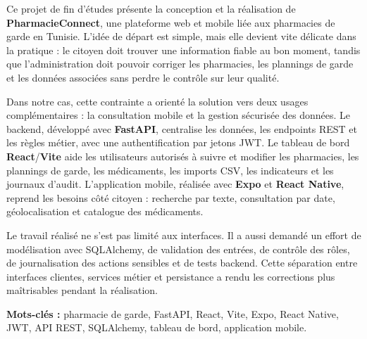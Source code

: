 Ce projet de fin d'études présente la conception et la réalisation de \textbf{PharmacieConnect}, une
plateforme web et mobile liée aux pharmacies de garde en Tunisie. L'idée de départ est simple, mais elle
devient vite délicate dans la pratique : le citoyen doit trouver une information fiable au bon moment, tandis
que l'administration doit pouvoir corriger les pharmacies, les plannings de garde et les données associées
sans perdre le contrôle sur leur qualité.

Dans notre cas, cette contrainte a orienté la solution vers deux usages complémentaires : la consultation
mobile et la gestion sécurisée des données. Le backend, développé avec \textbf{FastAPI}, centralise les
données, les endpoints REST et les règles métier, avec une authentification par jetons JWT. Le tableau de
bord \textbf{React}/\textbf{Vite} aide les utilisateurs autorisés à suivre et modifier les pharmacies, les
plannings de garde, les médicaments, les imports CSV, les indicateurs et les journaux d'audit. L'application
mobile, réalisée avec \textbf{Expo} et \textbf{React Native}, reprend les besoins côté citoyen : recherche par
texte, consultation par date, géolocalisation et catalogue des médicaments.

Le travail réalisé ne s'est pas limité aux interfaces. Il a aussi demandé un effort de modélisation avec
SQLAlchemy, de validation des entrées, de contrôle des rôles, de journalisation des actions sensibles et de
tests backend. Cette séparation entre interfaces clientes, services métier et persistance a rendu les
corrections plus maîtrisables pendant la réalisation.

\textbf{Mots-clés :} pharmacie de garde, FastAPI, React, Vite, Expo, React Native, JWT, API REST,
SQLAlchemy, tableau de bord, application mobile.
